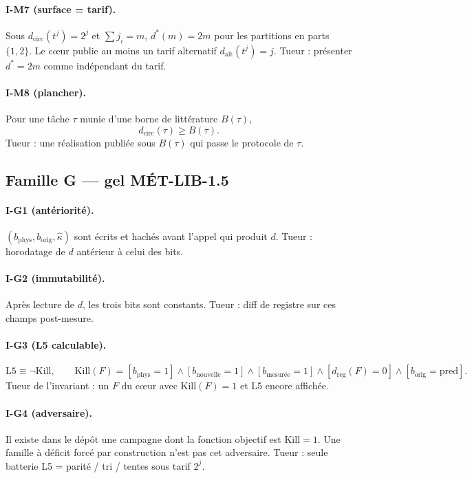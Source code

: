 \documentclass[11pt,a4paper]{article}
\theoremstyle{definition}
\begin{document}
\paragraph{I-M7 (surface = tarif).}
Sous $d_{\mathrm{circ}}(t^{j})=2^{j}$ et $\sum j_{i}=m$,
$d^{*}(m)=2m$ pour les partitions en parts $\{1,2\}$.
Le cœur publie au moins un tarif alternatif $d_{\mathrm{alt}}(t^{j})=j$.
Tueur : présenter $d^{*}=2m$ comme indépendant du tarif.

\paragraph{I-M8 (plancher).}
Pour une tâche $\tau$ munie d'une borne de littérature $B(\tau)$,
\[
d_{\mathrm{circ}}(\tau)\ge B(\tau).
\]
Tueur : une réalisation publiée sous $B(\tau)$ qui passe le protocole de $\tau$.

\subsection{Famille G --- gel MÉT-LIB-1.5}

\paragraph{I-G1 (antériorité).}
$(b_{\mathrm{phys}},b_{\mathrm{orig}},\hat\kappa)$ sont écrits et hachés
avant l'appel qui produit $d$.
Tueur : horodatage de $d$ antérieur à celui des bits.

\paragraph{I-G2 (immutabilité).}
Après lecture de $d$, les trois bits sont constants.
Tueur : diff de registre sur ces champs post-mesure.

\paragraph{I-G3 (L5 calculable).}
\[
\mathrm{L5}\equiv
\neg\mathrm{Kill},\qquad
\mathrm{Kill}(F)
=
[b_{\mathrm{phys}}=1]
\land
[b_{\mathrm{nouvelle}}=1]
\land
[b_{\mathrm{mesurée}}=1]
\land
[d_{\mathrm{reg}}(F)=0]
\land
[b_{\mathrm{orig}}=\mathrm{pred}].
\]
Tueur de l'invariant : un $F$ du cœur avec $\mathrm{Kill}(F)=1$ et L5 encore affichée.

\paragraph{I-G4 (adversaire).}
Il existe dans le dépôt une campagne dont la fonction objectif est $\mathrm{Kill}=1$.
Une famille à déficit forcé par construction n'est pas cet adversaire.
Tueur : seule batterie L5 = parité / tri / tentes sous tarif $2^{j}$.
\end{document}
